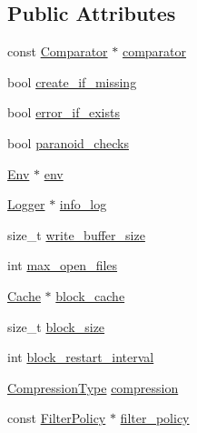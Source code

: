 \subsection*{Public Attributes}
\begin{DoxyCompactItemize}
\item 
const \hyperlink{structleveldb_1_1_comparator}{Comparator} $\ast$ \hyperlink{structleveldb_1_1_options_a7522fbf79de73c4f73ef8d9392e8c80b}{comparator}
\item 
bool \hyperlink{structleveldb_1_1_options_afe1b4e94164ff8f081b1c25bf1bcb62e}{create\-\_\-if\-\_\-missing}
\item 
bool \hyperlink{structleveldb_1_1_options_aff3b99b1b30a2dba9642adc6c912d5b7}{error\-\_\-if\-\_\-exists}
\item 
bool \hyperlink{structleveldb_1_1_options_a4263dcc655493100eecc9daf6737a10b}{paranoid\-\_\-checks}
\item 
\hyperlink{classleveldb_1_1_env}{Env} $\ast$ \hyperlink{structleveldb_1_1_options_aeb08bfe820e9c89f57446d6fbd2e6ea8}{env}
\item 
\hyperlink{classleveldb_1_1_logger}{Logger} $\ast$ \hyperlink{structleveldb_1_1_options_af5545cba00b0e9763ad0279a74acc429}{info\-\_\-log}
\item 
size\-\_\-t \hyperlink{structleveldb_1_1_options_a017f1f9558e6b3887434df29a16dac97}{write\-\_\-buffer\-\_\-size}
\item 
int \hyperlink{structleveldb_1_1_options_a25c6ea125fc63342d8fc25b2f7817be4}{max\-\_\-open\-\_\-files}
\item 
\hyperlink{classleveldb_1_1_cache}{Cache} $\ast$ \hyperlink{structleveldb_1_1_options_a4e87749ebac1ba28dff6bb63eb2059e5}{block\-\_\-cache}
\item 
size\-\_\-t \hyperlink{structleveldb_1_1_options_a715c7941b43db641e76e598aa9ab52a0}{block\-\_\-size}
\item 
int \hyperlink{structleveldb_1_1_options_ac71d66ae44e481edc3922d3a139c30b4}{block\-\_\-restart\-\_\-interval}
\item 
\hyperlink{namespaceleveldb_a047a8e77a76becb82bab4720994f6f9b}{Compression\-Type} \hyperlink{structleveldb_1_1_options_abdaf09c8bb3a788636ffb86cb93b01ab}{compression}
\item 
const \hyperlink{classleveldb_1_1_filter_policy}{Filter\-Policy} $\ast$ \hyperlink{structleveldb_1_1_options_a24c88997a866d535e68de15b5c3cd02b}{filter\-\_\-policy}
\end{DoxyCompactItemize}


